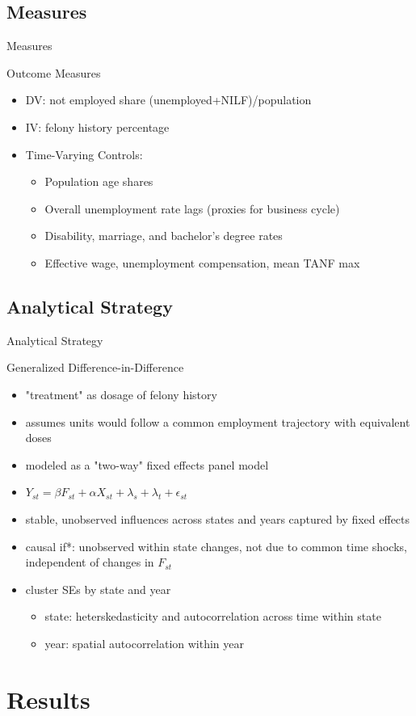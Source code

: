 \documentclass{beamer}
\begin{document}
\subsection{Measures}

\begin{frame}{Measures}
\begin{block}{Outcome Measures}
\begin{itemize}

\item DV: not employed share (unemployed+NILF)/population 
\item IV: felony history percentage
\item Time-Varying Controls:
  \begin{itemize}
  \item Population age shares
  \item Overall unemployment rate lags (proxies for business cycle)
  \item Disability, marriage, and bachelor's degree rates
  \item Effective wage, unemployment compensation, mean TANF max
\end{itemize}

\end{itemize}
\end{block}
\end{frame}

\subsection{Analytical Strategy}


\begin{frame}{Analytical Strategy}
\begin{block}{Generalized Difference-in-Difference}
\begin{itemize}
\item "treatment" as dosage of felony history
\item assumes units would follow a common employment trajectory with equivalent doses
\item modeled as a "two-way" fixed effects panel model
\item $Y_{st} = \beta F_{st} + \alpha X_{st} + \lambda_s + \lambda_t + \epsilon_{st}$
\item stable, unobserved influences across states and years captured by fixed effects
\item causal if*: unobserved within state changes, not due to common time shocks, independent of changes in $F_{st}$
\item cluster SEs by state and year
  \begin{itemize}
  \item state: heterskedasticity and autocorrelation across time within state
  \item year: spatial autocorrelation within year
  \end{itemize}

\end{itemize}
\end{block}
\end{frame}



\section{Results}
\end{document}
